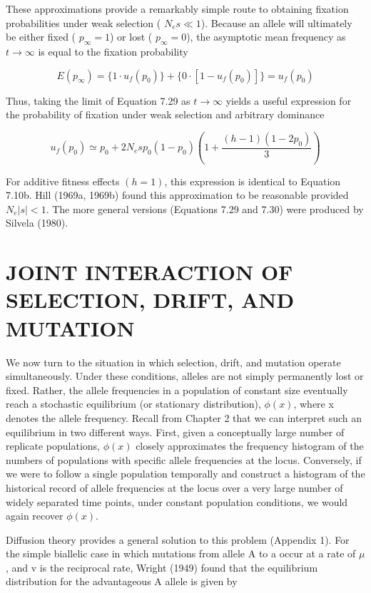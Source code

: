 \documentclass{article}
\begin{document}
These approximations provide a remarkably simple route to obtaining fixation probabilities under weak selection ( $ N_e s \ll 1 $). Because an allele will ultimately be either fixed ( $ p_\infty = 1 $) or lost ( $ p_\infty = 0 $), the asymptotic mean frequency as  $ t \to \infty $ is equal to the fixation probability

\begin{equation}
E(p_{\infty})=\{1\cdot u_{f}(p_{0})\}+\{0\cdot[1-u_{f}(p_{0})]\}=u_{f}(p_{0})
\end{equation}

Thus, taking the limit of Equation 7.29 as  $ t \to \infty $ yields a useful expression for the probability of fixation under weak selection and arbitrary dominance

\begin{equation}
u_{f}(p_{0})\simeq p_{0}+2N_{e}sp_{0}(1-p_{0})\left(1+\frac{(h-1)(1-2p_{0})}{3}\right)
\tag{7.30}
\label{eq:7_30}
\end{equation}

For additive fitness effects  $ (h = 1) $, this expression is identical to Equation 7.10b. Hill (1969a, 1969b) found this approximation to be reasonable provided  $ N_e | s| < 1 $. The more general versions (Equations 7.29 and 7.30) were produced by Silvela (1980).

\section{JOINT INTERACTION OF SELECTION, DRIFT, AND MUTATION}
We now turn to the situation in which selection, drift, and mutation operate simultaneously. Under these conditions, alleles are not simply permanently lost or fixed. Rather, the allele frequencies in a population of constant size eventually reach a stochastic equilibrium (or stationary distribution),  $ \phi(x) $, where x denotes the allele frequency. Recall from Chapter 2 that we can interpret such an equilibrium in two different ways. First, given a conceptually large number of replicate populations,  $ \phi(x) $ closely approximates the frequency histogram of the numbers of populations with specific allele frequencies at the locus. Conversely, if we were to follow a single population temporally and construct a histogram of the historical record of allele frequencies at the locus over a very large number of widely separated time points, under constant population conditions, we would again recover  $ \phi(x) $.

Diffusion theory provides a general solution to this problem (Appendix 1). For the simple biallelic case in which mutations from allele A to a occur at a rate of  $ \mu $, and v is the reciprocal rate, Wright (1949) found that the equilibrium distribution for the advantageous A allele is given by
\end{document}
